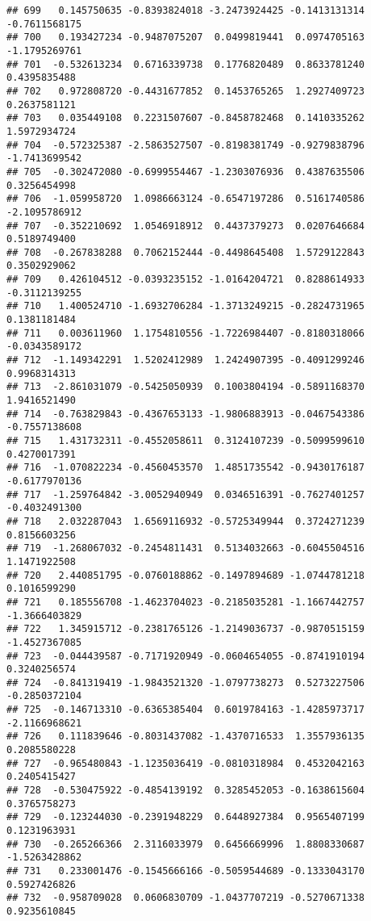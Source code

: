 \documentclass[
]{article}
\begin{document}
\begin{verbatim}
## 699   0.145750635 -0.8393824018 -3.2473924425 -0.1413131314 -0.7611568175
## 700   0.193427234 -0.9487075207  0.0499819441  0.0974705163 -1.1795269761
## 701  -0.532613234  0.6716339738  0.1776820489  0.8633781240  0.4395835488
## 702   0.972808720 -0.4431677852  0.1453765265  1.2927409723  0.2637581121
## 703   0.035449108  0.2231507607 -0.8458782468  0.1410335262  1.5972934724
## 704  -0.572325387 -2.5863527507 -0.8198381749 -0.9279838796 -1.7413699542
## 705  -0.302472080 -0.6999554467 -1.2303076936  0.4387635506  0.3256454998
## 706  -1.059958720  1.0986663124 -0.6547197286  0.5161740586 -2.1095786912
## 707  -0.352210692  1.0546918912  0.4437379273  0.0207646684  0.5189749400
## 708  -0.267838288  0.7062152444 -0.4498645408  1.5729122843  0.3502929062
## 709   0.426104512 -0.0393235152 -1.0164204721  0.8288614933 -0.3112139255
## 710   1.400524710 -1.6932706284 -1.3713249215 -0.2824731965  0.1381181484
## 711   0.003611960  1.1754810556 -1.7226984407 -0.8180318066 -0.0343589172
## 712  -1.149342291  1.5202412989  1.2424907395 -0.4091299246  0.9968314313
## 713  -2.861031079 -0.5425050939  0.1003804194 -0.5891168370  1.9416521490
## 714  -0.763829843 -0.4367653133 -1.9806883913 -0.0467543386 -0.7557138608
## 715   1.431732311 -0.4552058611  0.3124107239 -0.5099599610  0.4270017391
## 716  -1.070822234 -0.4560453570  1.4851735542 -0.9430176187 -0.6177970136
## 717  -1.259764842 -3.0052940949  0.0346516391 -0.7627401257 -0.4032491300
## 718   2.032287043  1.6569116932 -0.5725349944  0.3724271239  0.8156603256
## 719  -1.268067032 -0.2454811431  0.5134032663 -0.6045504516  1.1471922508
## 720   2.440851795 -0.0760188862 -0.1497894689 -1.0744781218  0.1016599290
## 721   0.185556708 -1.4623704023 -0.2185035281 -1.1667442757 -1.3666403829
## 722   1.345915712 -0.2381765126 -1.2149036737 -0.9870515159 -1.4527367085
## 723  -0.044439587 -0.7171920949 -0.0604654055 -0.8741910194  0.3240256574
## 724  -0.841319419 -1.9843521320 -1.0797738273  0.5273227506 -0.2850372104
## 725  -0.146713310 -0.6365385404  0.6019784163 -1.4285973717 -2.1166968621
## 726   0.111839646 -0.8031437082 -1.4370716533  1.3557936135  0.2085580228
## 727  -0.965480843 -1.1235036419 -0.0810318984  0.4532042163  0.2405415427
## 728  -0.530475922 -0.4854139192  0.3285452053 -0.1638615604  0.3765758273
## 729  -0.123244030 -0.2391948229  0.6448927384  0.9565407199  0.1231963931
## 730  -0.265266366  2.3116033979  0.6456669996  1.8808330687 -1.5263428862
## 731   0.233001476 -0.1545666166 -0.5059544689 -0.1333043170  0.5927426826
## 732  -0.958709028  0.0606830709 -1.0437707219 -0.5270671338  0.9235610845

\end{verbatim}
\end{document}
